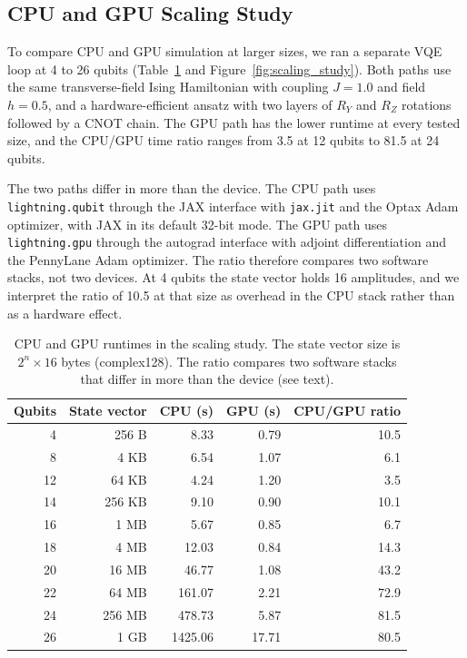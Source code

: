 \documentclass[11pt]{article}
\begin{document}
\subsection{CPU and GPU Scaling Study}

To compare CPU and GPU simulation at larger sizes, we ran a separate VQE loop at 4 to 26 qubits (Table~\ref{tab:gpu_scaling} and Figure~\ref{fig:scaling_study}). Both paths use the same transverse-field Ising Hamiltonian with coupling $J = 1.0$ and field $h = 0.5$, and a hardware-efficient ansatz with two layers of $R_Y$ and $R_Z$ rotations followed by a CNOT chain. The GPU path has the lower runtime at every tested size, and the CPU/GPU time ratio ranges from 3.5 at 12 qubits to 81.5 at 24 qubits.

The two paths differ in more than the device. The CPU path uses \texttt{lightning.qubit} through the JAX interface with \texttt{jax.jit} and the Optax Adam optimizer, with JAX in its default 32-bit mode. The GPU path uses \texttt{lightning.gpu} through the autograd interface with adjoint differentiation and the PennyLane Adam optimizer. The ratio therefore compares two software stacks, not two devices. At 4 qubits the state vector holds 16 amplitudes, and we interpret the ratio of 10.5 at that size as overhead in the CPU stack rather than as a hardware effect.

\begin{table}[t]
    \centering
    \small
    \begin{tabular}{rrrrr}
        \toprule
        Qubits & State vector & CPU (s) & GPU (s) & CPU/GPU ratio \\
        \midrule
        4  & 256 B  & 8.33    & 0.79  & 10.5 \\
        8  & 4 KB   & 6.54    & 1.07  & 6.1  \\
        12 & 64 KB  & 4.24    & 1.20  & 3.5  \\
        14 & 256 KB & 9.10    & 0.90  & 10.1 \\
        16 & 1 MB   & 5.67    & 0.85  & 6.7  \\
        18 & 4 MB   & 12.03   & 0.84  & 14.3 \\
        20 & 16 MB  & 46.77   & 1.08  & 43.2 \\
        22 & 64 MB  & 161.07  & 2.21  & 72.9 \\
        24 & 256 MB & 478.73  & 5.87  & 81.5 \\
        26 & 1 GB   & 1425.06 & 17.71 & 80.5 \\
        \bottomrule
    \end{tabular}
    \caption{CPU and GPU runtimes in the scaling study. The state vector size is $2^n \times 16$ bytes (complex128). The ratio compares two software stacks that differ in more than the device (see text).}
    \label{tab:gpu_scaling}
\end{table}
\end{document}
